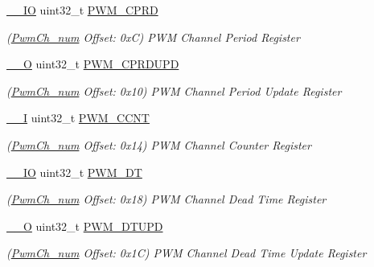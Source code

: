 \begin{DoxyCompactItemize}
\mbox{\label{structPwmCh__num_aa931e2fbe63d8e5104cbc6605d4cd19f}} 
\mbox{\hyperlink{core__cm7_8h_aec43007d9998a0a0e01faede4133d6be}{\+\_\+\+\_\+\+IO}} uint32\+\_\+t \mbox{\hyperlink{structPwmCh__num_aa931e2fbe63d8e5104cbc6605d4cd19f}{P\+W\+M\+\_\+\+C\+P\+RD}}
\begin{DoxyCompactList}\small\item\em (\mbox{\hyperlink{structPwmCh__num}{Pwm\+Ch\+\_\+num}} Offset\+: 0xC) P\+WM Channel Period Register \end{DoxyCompactList}\item 
\mbox{\label{structPwmCh__num_a4890730c296599df60c71441cd33a173}} 
\mbox{\hyperlink{core__cm7_8h_a7e25d9380f9ef903923964322e71f2f6}{\+\_\+\+\_\+O}} uint32\+\_\+t \mbox{\hyperlink{structPwmCh__num_a4890730c296599df60c71441cd33a173}{P\+W\+M\+\_\+\+C\+P\+R\+D\+U\+PD}}
\begin{DoxyCompactList}\small\item\em (\mbox{\hyperlink{structPwmCh__num}{Pwm\+Ch\+\_\+num}} Offset\+: 0x10) P\+WM Channel Period Update Register \end{DoxyCompactList}\item 
\mbox{\label{structPwmCh__num_a57f094a421256dd066de5115edb2660e}} 
\mbox{\hyperlink{core__cm7_8h_af63697ed9952cc71e1225efe205f6cd3}{\+\_\+\+\_\+I}} uint32\+\_\+t \mbox{\hyperlink{structPwmCh__num_a57f094a421256dd066de5115edb2660e}{P\+W\+M\+\_\+\+C\+C\+NT}}
\begin{DoxyCompactList}\small\item\em (\mbox{\hyperlink{structPwmCh__num}{Pwm\+Ch\+\_\+num}} Offset\+: 0x14) P\+WM Channel Counter Register \end{DoxyCompactList}\item 
\mbox{\label{structPwmCh__num_af66125bdfd293b434fbb50611edcc735}} 
\mbox{\hyperlink{core__cm7_8h_aec43007d9998a0a0e01faede4133d6be}{\+\_\+\+\_\+\+IO}} uint32\+\_\+t \mbox{\hyperlink{structPwmCh__num_af66125bdfd293b434fbb50611edcc735}{P\+W\+M\+\_\+\+DT}}
\begin{DoxyCompactList}\small\item\em (\mbox{\hyperlink{structPwmCh__num}{Pwm\+Ch\+\_\+num}} Offset\+: 0x18) P\+WM Channel Dead Time Register \end{DoxyCompactList}\item 
\mbox{\label{structPwmCh__num_a078f485478b95cd1e7a168ab5eab8067}} 
\mbox{\hyperlink{core__cm7_8h_a7e25d9380f9ef903923964322e71f2f6}{\+\_\+\+\_\+O}} uint32\+\_\+t \mbox{\hyperlink{structPwmCh__num_a078f485478b95cd1e7a168ab5eab8067}{P\+W\+M\+\_\+\+D\+T\+U\+PD}}
\begin{DoxyCompactList}\small\item\em (\mbox{\hyperlink{structPwmCh__num}{Pwm\+Ch\+\_\+num}} Offset\+: 0x1C) P\+WM Channel Dead Time Update Register \end{DoxyCompactList}\end{DoxyCompactItemize}


